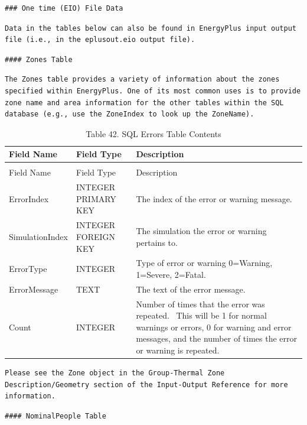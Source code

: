 \begin{lstlisting}
### One time (EIO) File Data
\end{lstlisting}

\begin{lstlisting}
Data in the tables below can also be found in EnergyPlus input output file (i.e., in the eplusout.eio output file).
\end{lstlisting}

\begin{lstlisting}
#### Zones Table
\end{lstlisting}

\begin{lstlisting}
The Zones table provides a variety of information about the zones specified within EnergyPlus. One of its most common uses is to provide zone name and area information for the other tables within the SQL database (e.g., use the ZoneIndex to look up the ZoneName).
\end{lstlisting}

\begin{longtable}[c]{p{1.5in}p{1.5in}p{2.99in}}
\caption{Table 42. SQL Errors Table Contents \label{table:table-42.-sql-errors-table-contents}} \tabularnewline
\toprule 
Field Name & Field Type & Description \tabularnewline
\midrule
\endfirsthead

\caption[]{Table 42. SQL Errors Table Contents} \tabularnewline
\toprule 
Field Name & Field Type & Description \tabularnewline
\midrule
\endhead

ErrorIndex & INTEGER PRIMARY KEY & The index of the error or warning message. \tabularnewline
SimulationIndex & INTEGER FOREIGN KEY & The simulation the error or warning pertains to. \tabularnewline
ErrorType & INTEGER & Type of error or warning 0=Warning, 1=Severe, 2=Fatal. \tabularnewline
ErrorMessage & TEXT & The text of the error message. \tabularnewline
Count & INTEGER & Number of times that the error was repeated.~ This will be 1 for normal warnings or errors, 0 for warning and error messages, and the number of times the error or warning is repeated. \tabularnewline
\bottomrule
\end{longtable}

\begin{lstlisting}
Please see the Zone object in the Group-Thermal Zone Description/Geometry section of the Input-Output Reference for more information.
\end{lstlisting}

\begin{lstlisting}
#### NominalPeople Table
\end{lstlisting}

